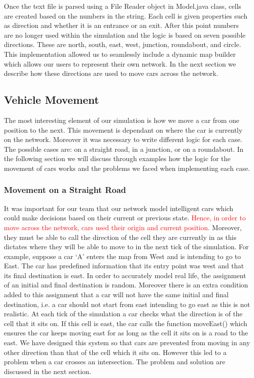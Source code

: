 \documentclass{article}
\begin{document}
\vspace{0.5cm}
Once the text file is parsed using a File Reader object in Model.java class, cells are created based on the numbers in the string. Each cell is given properties such as direction and whether it is an entrance or an exit. After this point numbers are no longer used within the simulation and the logic is based on seven possible directions. These are north, south, east, west, junction, roundabout, and circle. This implementation allowed us to seamlessly include a dynamic map builder which allows our users to represent their own network. In the next section we describe how these directions are used to move cars across the network. 



\subsection{Vehicle Movement}

The most interesting element of our simulation is how we move a car from one position to the next. This movement is dependant on where the car is currently on the network. Moreover it was necessary to write different logic for each case. The possible cases are: on a straight road, in a junction, or on a roundabout. In the following section we will discuss through examples how the logic for the movement of cars works and the problems we faced when implementing each case. 

\subsubsection{Movement on a Straight Road}
It was important for our team that our network model intelligent cars which could make decisions based on their current or previous state. \textcolor{red}{Hence, in order to move across the network, cars used their origin and current position.} Moreover, they must be able to call the direction of the cell they are currently in as this dictates where they will be able to move to in the next tick of the simulation. For example, suppose a car `A' enters the map from West and is intending to go to East. The car has predefined information that its entry point was west and that its final destination is east. In order to accurately model real life, the assignment of an initial and final destination is random. 
Moreover there is an extra condition added to this assignment that a car will not have the same initial and final destination, i.e. a car should not start from east intending to go east as this is not realistic. At each tick of the simulation a car checks what the  direction is of the cell that it sits on. If this cell is east, the car calls the function moveEast() which ensures the car keeps moving east for as long as the cell it sits on is a road to the east. We have designed this system so that cars are prevented from moving in any other direction than that of the cell which it sits on. However this led to a problem when a car crosses an intersection. The problem and solution are discussed in the next section. 
\end{document}
